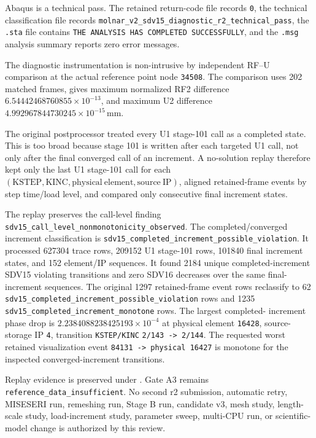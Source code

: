 \documentclass[11pt,a4paper]{article}
\begin{document}
Abaqus is a technical pass. The retained return-code file records
\texttt{0}, the technical classification file records
\texttt{molnar\_v2\_sdv15\_diagnostic\_r2\_technical\_pass}, the \texttt{.sta}
file contains \texttt{THE ANALYSIS HAS COMPLETED SUCCESSFULLY}, and the
\texttt{.msg} analysis summary reports zero error messages.

The diagnostic instrumentation is non-intrusive by independent RF--U comparison
at the actual reference point node \texttt{34508}. The comparison uses 202
matched frames, gives maximum normalized RF2 difference
\(6.54442468760855\times10^{-13}\), and maximum U2 difference
\(4.992967844730245\times10^{-15}\,\mathrm{mm}\).

The original postprocessor treated every U1 stage-101 call as a completed
state. This is too broad because stage 101 is written after each targeted U1
call, not only after the final converged call of an increment. A no-solution
replay therefore kept only the last U1 stage-101 call for each
\((\mathrm{KSTEP},\mathrm{KINC},\mathrm{physical\ element},\mathrm{source\ IP})\),
aligned retained-frame events by step time/load level, and compared only
consecutive final increment states.

The replay preserves the call-level finding
\texttt{sdv15\_call\_level\_nonmonotonicity\_observed}. The completed/converged
increment classification is
\texttt{sdv15\_completed\_increment\_possible\_violation}. It processed 627304
trace rows, 209152 U1 stage-101 rows, 101840 final increment states, and 152
element/IP sequences. It found 2184 unique completed-increment SDV15 violating
transitions and zero SDV16 decreases over the same final-increment sequences.
The original 1297 retained-frame event rows reclassify to 62
\texttt{sdv15\_completed\_increment\_possible\_violation} rows and 1235
\texttt{sdv15\_completed\_increment\_monotone} rows. The largest completed-
increment phase drop is \(2.2384088238425193\times10^{-4}\) at physical element
\texttt{16428}, source-storage IP \texttt{4}, transition \texttt{KSTEP/KINC}
\texttt{2/143 -> 2/144}. The requested worst retained visualization event
\texttt{84131 -> physical 16427} is monotone for the inspected
converged-increment transitions.

Replay evidence is preserved under
.
Gate A3 remains \texttt{reference\_data\_insufficient}. No second r2 submission,
automatic retry, MISESERI run, remeshing run, Stage B run, candidate v3, mesh
study, length-scale study, load-increment study, parameter sweep, multi-CPU run,
or scientific-model change is authorized by this review.
\end{document}
